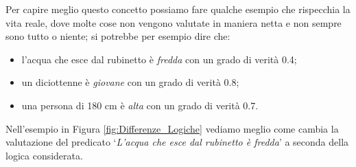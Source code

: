 \documentclass[a4paper,12pt]{report}
\begin{document}
\bigskip

Per capire meglio questo concetto possiamo fare qualche esempio che rispecchia la vita reale, dove molte cose non vengono valutate in maniera netta e non sempre sono tutto o niente; si potrebbe per esempio dire che:


\begin{itemize}
    \item l'acqua che esce dal rubinetto è  \textit{fredda} con un grado di verità 0.4;
    \item un diciottenne è \textit{giovane} con un grado di verità 0.8;
    \item una persona di 180 cm è \textit{alta} con un grado di verità 0.7.
\end{itemize}

\noindent Nell'esempio in Figura \ref{fig:Differenze_Logiche} vediamo meglio come cambia la valutazione del predicato `\textit{L'acqua che esce dal rubinetto è fredda}' a seconda della logica considerata.
\end{document}
